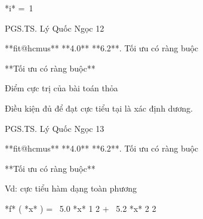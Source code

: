 



*i* = 1

PGS.TS. Lý Quốc Ngọc 12

**fit@hcmus** **4.0** **6.2**. Tối ưu có ràng buộc

**Tối ưu có ràng buộc**

Điểm cực trị của bài toán thỏa


































Điều kiện đủ để đạt cực tiểu tại là xác định dương.

PGS.TS. Lý Quốc Ngọc 13

**fit@hcmus** **4.0** **6.2**. Tối ưu có ràng buộc

**Tối ưu có ràng buộc**

Vd: cực tiểu hàm dạng toàn phương

*f* ( *x* ) =  5.0 *x* 1 2 +  5.2 *x* 2 2

